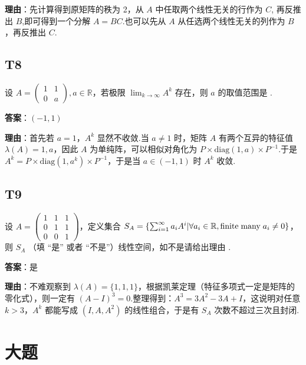 \documentclass{article}
\begin{document}
\par \textbf{理由}：先计算得到原矩阵的秩为 2，从 $A$ 中任取两个线性无关的行作为 $C$, 再反推出 $B$,即可得到一个分解 $A=BC$.也可以先从 $A$ 从任选两个线性无关的列作为 $B$，再反推出 $C$.

\subsection{T8}

\par 设 $A=\begin{pmatrix}
	1 & 1\\
	0 & a
\end{pmatrix}, a\in \mathbb R$，若极限 $\lim_{k\to \infty}A^k$ 存在，则 $a$ 的取值范围是 \underline{\phantom{empty\_space}}.

\par \textbf{答案}：$(-1, 1)$

\par \textbf{理由}：首先若 $a=1$，$A^k$ 显然不收敛.当 $a\neq 1$ 时，矩阵 $A$ 有两个互异的特征值 $\lambda(A)={1, a}$，因此 $A$ 为单纯阵，可以相似对角化为 $P\times \text{diag}(1, a)\times P^{-1}$.于是 $A^k=P\times \text{diag}(1, a^k)\times P^{-1}$，于是当 $a\in(-1, 1)$ 时 $A^k$ 收敛.

\subsection{T9}

\par 设 $A=\begin{pmatrix}
	1 & 1 & 1\\
	0 & 1 & 1\\
	0 & 0 & 1
\end{pmatrix}$，定义集合 $S_A=\{\sum_{i=1}^\infty a_iA^i|\forall a_i\in \mathbb R, \text{finite\;many\;} a_i\neq 0\}$，则 $S_A$ \underline{\phantom{empty\_space}}（填 “是” 或者 “不是”）线性空间，如不是请给出理由 \underline{\phantom{empty\_space}} .

\par \textbf{答案}：是

\par \textbf{理由}：不难观察到 $\lambda(A)=\{1, 1, 1\}$，根据凯莱定理（特征多项式一定是矩阵的零化式），则一定有 $(A-I)^3=0$.整理得到：$A^3=3A^2-3A+I$，这说明对任意 $k>3$，$A^k$ 都能写成 $(I, A, A^2)$ 的线性组合，于是有 $S_A$ 次数不超过三次且封闭.

\section{大题}
\end{document}

